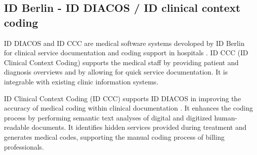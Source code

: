 \subsection{ID Berlin - ID DIACOS / ID clinical context coding}\label{subsec:id-berlin---id-clinical-context-coding}
ID DIACOS and ID CCC are medical software systems devoloped by ID Berlin for clinical service documentation and coding support in hospitals \cite{IDBerlin2023}.
ID CCC (ID Clinical Context Coding) supports the medical staff by providing patient and diagnosis overviews and by allowing for quick service documentation.
It is integrable with existing clinic information systems.

ID Clinical Context Coding (ID CCC) supports ID DIACOS in improving the accuracy of medical coding within clinical documentation \cite{IDBerlin2023}.
It enhances the coding process by performing semantic text analyses of digital and digitized human-readable documents.
It identifies hidden services provided during treatment and generates medical codes, supporting the manual coding process of billing professionals.
